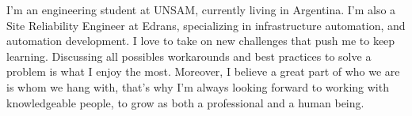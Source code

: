 

\begin{cvparagraph}

    I'm an engineering student at UNSAM, currently living in Argentina. I'm also a Site Reliability Engineer at Edrans, specializing in infrastructure automation, and automation development. I love to take on new challenges that push me to keep learning. Discussing all possibles workarounds and best practices to solve a problem is what I enjoy the most. Moreover, I believe a great part of who we are is whom we hang with, that's why I'm always looking forward to working with knowledgeable people, to grow as both a professional and a human being.
\end{cvparagraph}
